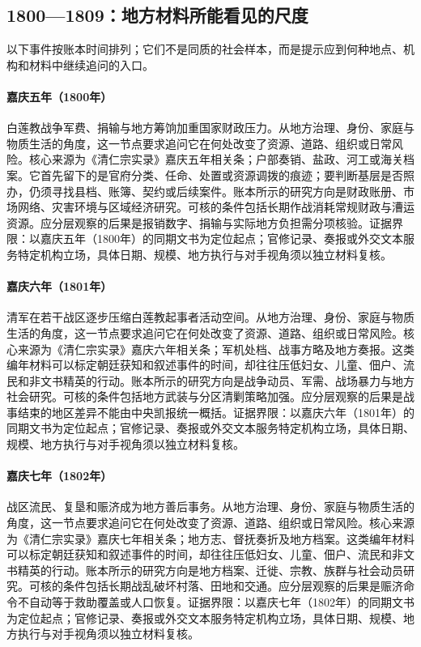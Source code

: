 \subsection{1800—1809：地方材料所能看见的尺度}
以下事件按账本时间排列；它们不是同质的社会样本，而是提示应到何种地点、机构和材料中继续追问的入口。
\hypertarget{social:EQ-1800-WHITE-LOTUS-FINANCE}{}\paragraph{嘉庆五年（1800年）}白莲教战争军费、捐输与地方筹饷加重国家财政压力。从地方治理、身份、家庭与物质生活的角度，这一节点要求追问它在何处改变了资源、道路、组织或日常风险。核心来源为《清仁宗实录》嘉庆五年相关条；户部奏销、盐政、河工或海关档案。它首先留下的是官府分类、任命、处置或资源调拨的痕迹；要判断基层是否照办，仍须寻找县档、账簿、契约或后续案件。账本所示的研究方向是财政账册、市场网络、灾害环境与区域经济研究。可核的条件包括长期作战消耗常规财政与漕运资源。应分层观察的后果是报销数字、捐输与实际地方负担需分项核验。证据界限：以嘉庆五年（1800年）的同期文书为定位起点；官修记录、奏报或外交文本服务特定机构立场，具体日期、规模、地方执行与对手视角须以独立材料复核。
\hypertarget{social:EQ-1801-WHITE-LOTUS-SUPPRESSION}{}\paragraph{嘉庆六年（1801年）}清军在若干战区逐步压缩白莲教起事者活动空间。从地方治理、身份、家庭与物质生活的角度，这一节点要求追问它在何处改变了资源、道路、组织或日常风险。核心来源为《清仁宗实录》嘉庆六年相关条；军机处档、战事方略及地方奏报。这类编年材料可以标定朝廷获知和叙述事件的时间，却往往压低妇女、儿童、佃户、流民和非文书精英的行动。账本所示的研究方向是战争动员、军需、战场暴力与地方社会研究。可核的条件包括地方武装与分区清剿策略加强。应分层观察的后果是战事结束的地区差异不能由中央凯报统一概括。证据界限：以嘉庆六年（1801年）的同期文书为定位起点；官修记录、奏报或外交文本服务特定机构立场，具体日期、规模、地方执行与对手视角须以独立材料复核。
\hypertarget{social:EQ-1802-WAR-REFUGEE-RELIEF}{}\paragraph{嘉庆七年（1802年）}战区流民、复垦和赈济成为地方善后事务。从地方治理、身份、家庭与物质生活的角度，这一节点要求追问它在何处改变了资源、道路、组织或日常风险。核心来源为《清仁宗实录》嘉庆七年相关条；地方志、督抚奏折及地方档案。这类编年材料可以标定朝廷获知和叙述事件的时间，却往往压低妇女、儿童、佃户、流民和非文书精英的行动。账本所示的研究方向是地方档案、迁徙、宗教、族群与社会动员研究。可核的条件包括长期战乱破坏村落、田地和交通。应分层观察的后果是赈济命令不自动等于救助覆盖或人口恢复。证据界限：以嘉庆七年（1802年）的同期文书为定位起点；官修记录、奏报或外交文本服务特定机构立场，具体日期、规模、地方执行与对手视角须以独立材料复核。
